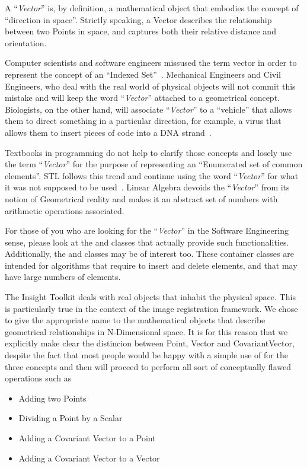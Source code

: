 A ``\emph{Vector}'' is, by definition, a mathematical object that embodies the
concept of ``direction in space''. Strictly speaking, a Vector describes the
relationship between two Points in space, and captures both their relative
distance and orientation.

Computer scientists and software engineers missused the term vector in order to
represent the concept of an ``Indexed Set''~\cite{Austern1999}.  Mechanical
Engineers and Civil Engineers, who deal with the real world of physical objects
will not commit this mistake and will keep the word ``\emph{Vector}'' attached
to a geometrical concept.  Biologists, on the other hand, will associate
``\emph{Vector}'' to a ``vehicle'' that allows them to direct something in a
particular direction, for example, a virus that allows them to insert pieces of
code into a DNA strand~\cite{Lodish2000}.

Textbooks in programming do not help to clarify those concepts and losely use
the term ``\emph{Vector}'' for the purpose of representing an ``Enumerated set
of common elements''. STL follows this trend and continue using the word
``\emph{Vector}'' for what it was not supposed to be
used~\cite{Austern1999,Alexandrescu2001}. Linear Algebra devoids the
``\emph{Vector}'' from its notion of Geometrical reality and makes it an
abstract set of numbers with arithmetic operations associated.

For those of you who are looking for the ``\emph{Vector}'' in the Software
Engineering sense, please look at the  and 
classes that actually provide such functionalities. Additionally, the
 and  classes may be of interest
too. These container classes are intended for algorithms that require to insert
and delete elements, and that may have large numbers of elements.

The Insight Toolkit deals with real objects that inhabit the physical space.
This is particularly true in the context of the image registration framework.
We chose to give the appropriate name to the mathematical objects that describe
geometrical relationships in N-Dimensional space. It is for this reason that we
explicitly make clear the distincion between Point, Vector and CovariantVector,
despite the fact that most people would be happy with a simple use of
 for the three concepts and then will proceed to perform all
sort of conceptually flawed operations such as 

\begin{itemize}
\item Adding two Points
\item Dividing a Point by a Scalar
\item Adding a Covariant Vector to a Point
\item Adding a Covariant Vector to a Vector
\end{itemize}

